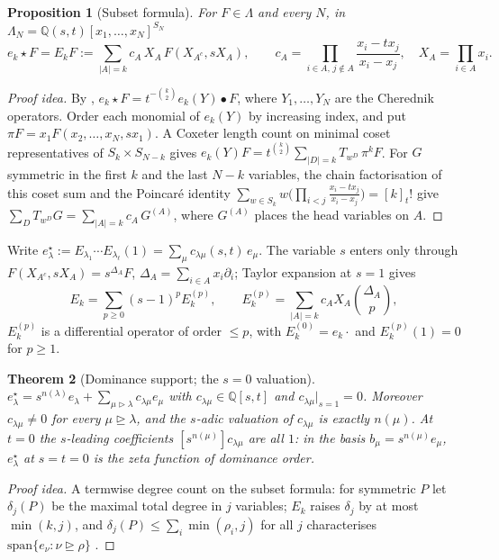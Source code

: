 \documentclass[submission]{FPSAC2027}
\newtheorem{theorem}{Theorem}[section]
\newtheorem{proposition}[theorem]{Proposition}
\theoremstyle{definition}
\theoremstyle{remark}
\newcommand{\Lam}{\Lambda}
\begin{document}
\begin{proposition}[Subset formula]\label{prop:subset}
For $F\in\Lam$ and every $N$, in $\Lam_N=\mathbb{Q}(s,t)[x_1,\dots,x_N]^{S_N}$
\[ e_k\star F=E_kF:=\sum_{|A|=k}c_A\,X_A\,F(X_{A^c},sX_A),\qquad c_A=\prod_{i\in A,\,j\notin A}\frac{x_i-tx_j}{x_i-x_j},\quad X_A=\prod_{i\in A}x_i. \]
\end{proposition}
\begin{proof}[Proof idea]
By \cite[Def.~3.4, Lemma~3.3]{Hikita25}, $e_k\star F=t^{-\binom k2}e_k(Y)\bullet F$, where $Y_1,\dots,Y_N$ are the Cherednik operators. Order each monomial of $e_k(Y)$ by increasing index, and put $\pi F=x_1F(x_2,\dots,x_N,sx_1)$. A Coxeter length count on minimal coset representatives of $S_k\times S_{N-k}$ gives $e_k(Y)F=t^{\binom k2}\sum_{|D|=k}T_{w^D}\,\pi^kF$. For $G$ symmetric in the first $k$ and the last $N-k$ variables, the chain factorisation of this coset sum and the Poincar\'e identity $\sum_{w\in S_k}w\bigl(\prod_{i<j}\frac{x_i-tx_j}{x_i-x_j}\bigr)=[k]_t!$ give $\sum_DT_{w^D}G=\sum_{|A|=k}c_A\,G^{(A)}$, where $G^{(A)}$ places the head variables on $A$.
\end{proof}

Write $e^\star_\lambda:=E_{\lambda_1}\cdots E_{\lambda_\ell}(1)=\sum_\mu c_{\lambda\mu}(s,t)\,e_\mu$. The variable $s$ enters only through $F(X_{A^c},sX_A)=s^{\Delta_A}F$, $\Delta_A=\sum_{i\in A}x_i\partial_i$; Taylor expansion at $s=1$ gives
\begin{equation}\label{eq:taylor}
E_k=\sum_{p\ge0}(s-1)^pE_k^{(p)},\qquad E_k^{(p)}=\sum_{|A|=k}c_AX_A\binom{\Delta_A}{p},
\end{equation}
$E_k^{(p)}$ is a differential operator of order $\le p$, with $E_k^{(0)}=e_k\cdot$ and $E_k^{(p)}(1)=0$ for $p\ge1$.

\begin{theorem}[Dominance support; the $s=0$ valuation]\label{thm:DS}
$e^\star_\lambda=s^{n(\lambda)}e_\lambda+\sum_{\mu\triangleright\lambda}c_{\lambda\mu}e_\mu$ with $c_{\lambda\mu}\in\mathbb{Q}[s,t]$ and $c_{\lambda\mu}|_{s=1}=0$. Moreover $c_{\lambda\mu}\neq0$ for every $\mu\trianglerighteq\lambda$, and the $s$-adic valuation of $c_{\lambda\mu}$ is exactly $n(\mu)$. At $t=0$ the $s$-leading coefficients $[s^{n(\mu)}]c_{\lambda\mu}$ are all $1$: in the basis $b_\mu=s^{n(\mu)}e_\mu$, $e^\star_\lambda$ at $s=t=0$ is the zeta function of dominance order.
\end{theorem}
\begin{proof}[Proof idea]
A termwise degree count on the subset formula: for symmetric $P$ let $\delta_j(P)$ be the maximal total degree in $j$ variables; $E_k$ raises $\delta_j$ by at most $\min(k,j)$, and $\delta_j(P)\le\sum_i\min(\rho_i,j)$ for all $j$ characterises $\mathrm{span}\{e_\nu:\nu\trianglerighteq\rho\}$ \cite[I (1.11), (6.6)]{Macdonald95}.
\end{proof}
\end{document}
